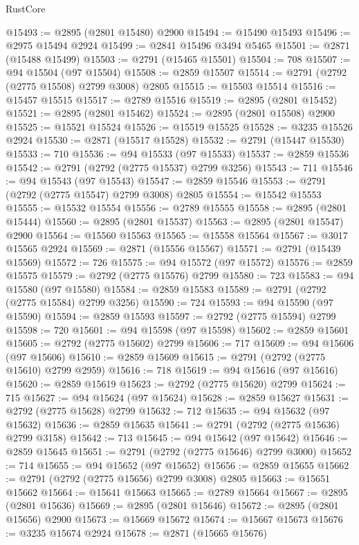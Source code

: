 \begin{lexlean}{RustCore}
\begin{coremodule}
@15493 := @2895 (@2801 @15480) @2900
@15494 := @15490 @15493
@15496 := @2975 @15494 @2924
@15499 := @2841 @15496 @3494 @5465
@15501 := @2871 (@15488 @15499)
@15503 := @2791 (@15465 @15501)
@15504 := 708
@15507 := @94 @15504 (@97 @15504)
@15508 := @2859 @15507
@15514 := @2791 (@2792 (@2775 @15508) @2799 @3008) @2805
@15515 := @15503 @15514
@15516 := @15457 @15515
@15517 := @2789 @15516
@15519 := @2895 (@2801 @15452)
@15521 := @2895 (@2801 @15462)
@15524 := @2895 (@2801 @15508) @2900
@15525 := @15521 @15524
@15526 := @15519 @15525
@15528 := @3235 @15526 @2924
@15530 := @2871 (@15517 @15528)
@15532 := @2791 (@15447 @15530)
@15533 := 710
@15536 := @94 @15533 (@97 @15533)
@15537 := @2859 @15536
@15542 := @2791 (@2792 (@2775 @15537) @2799 @3256)
@15543 := 711
@15546 := @94 @15543 (@97 @15543)
@15547 := @2859 @15546
@15553 := @2791 (@2792 (@2775 @15547) @2799 @3008) @2805
@15554 := @15542 @15553
@15555 := @15532 @15554
@15556 := @2789 @15555
@15558 := @2895 (@2801 @15444)
@15560 := @2895 (@2801 @15537)
@15563 := @2895 (@2801 @15547) @2900
@15564 := @15560 @15563
@15565 := @15558 @15564
@15567 := @3017 @15565 @2924
@15569 := @2871 (@15556 @15567)
@15571 := @2791 (@15439 @15569)
@15572 := 726
@15575 := @94 @15572 (@97 @15572)
@15576 := @2859 @15575
@15579 := @2792 (@2775 @15576) @2799
@15580 := 723
@15583 := @94 @15580 (@97 @15580)
@15584 := @2859 @15583
@15589 := @2791 (@2792 (@2775 @15584) @2799 @3256)
@15590 := 724
@15593 := @94 @15590 (@97 @15590)
@15594 := @2859 @15593
@15597 := @2792 (@2775 @15594) @2799
@15598 := 720
@15601 := @94 @15598 (@97 @15598)
@15602 := @2859 @15601
@15605 := @2792 (@2775 @15602) @2799
@15606 := 717
@15609 := @94 @15606 (@97 @15606)
@15610 := @2859 @15609
@15615 := @2791 (@2792 (@2775 @15610) @2799 @2959)
@15616 := 718
@15619 := @94 @15616 (@97 @15616)
@15620 := @2859 @15619
@15623 := @2792 (@2775 @15620) @2799
@15624 := 715
@15627 := @94 @15624 (@97 @15624)
@15628 := @2859 @15627
@15631 := @2792 (@2775 @15628) @2799
@15632 := 712
@15635 := @94 @15632 (@97 @15632)
@15636 := @2859 @15635
@15641 := @2791 (@2792 (@2775 @15636) @2799 @3158)
@15642 := 713
@15645 := @94 @15642 (@97 @15642)
@15646 := @2859 @15645
@15651 := @2791 (@2792 (@2775 @15646) @2799 @3000)
@15652 := 714
@15655 := @94 @15652 (@97 @15652)
@15656 := @2859 @15655
@15662 := @2791 (@2792 (@2775 @15656) @2799 @3008) @2805
@15663 := @15651 @15662
@15664 := @15641 @15663
@15665 := @2789 @15664
@15667 := @2895 (@2801 @15636)
@15669 := @2895 (@2801 @15646)
@15672 := @2895 (@2801 @15656) @2900
@15673 := @15669 @15672
@15674 := @15667 @15673
@15676 := @3235 @15674 @2924
@15678 := @2871 (@15665 @15676)

\end{coremodule}
\end{lexlean}
